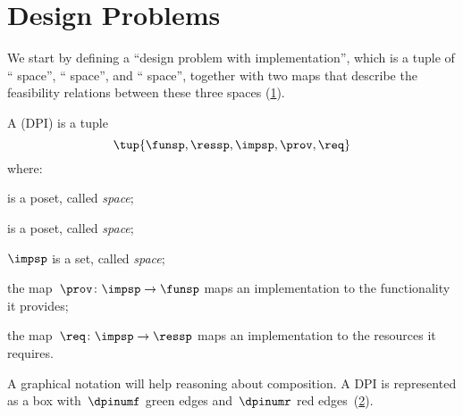 

\section{Design Problems}
\label{sec:Design-Problems}

We start by defining a ``design problem with implementation'', which is a tuple of `` space'', `` space'', and `` space'', together with two maps that describe the feasibility relations between these three spaces (\cref{fig:setup}).

\begin{definition}
  \label{def:DPI}
  A \emph{} (DPI) is a tuple
  \begin{equation}
    \tup{\funsp, \ressp, \impsp, \prov,\req}
  \end{equation}
  where:

  \begin{compactitem}
    \item \funsp is a poset, called \emph{ space};
    \item \ressp is a poset, called \emph{ space};
    \item $\impsp$ is a set, called \emph{ space};
    \item the map~$\prov\colon\impsp\rightarrow\funsp$
    maps an implementation to the functionality it provides;
    \item the map~$\req\colon\impsp\rightarrow\ressp$
    maps an implementation to the resources it requires.
  \end{compactitem}

\end{definition}

\begin{figure}[h]
  \begin{center}
  \end{center}
  \caption{\label{fig:setup}}
\end{figure}


A graphical notation will help reasoning about composition. A DPI is represented as a box with~$\dpinumf$ green edges and~$\dpinumr$ red edges~(\cref{fig:dp_graphical}).

\begin{figure}[h]
  \centering
  \caption{\label{fig:dp_graphical}}
\end{figure}

